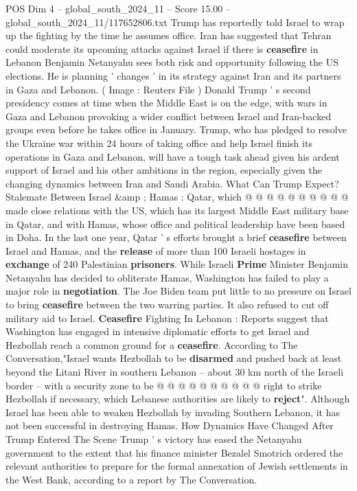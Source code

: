\begin{textsample}{POS Dim 4 – global\_south\_2024\_11 – Score 15.00 – global\_south\_2024\_11/117652806.txt}  \label{ex:f4_pos_259}
Trump has reportedly told Israel to wrap up the fighting by the time he assumes office.
Iran has suggested that Tehran could moderate its upcoming attacks against Israel if there is \textbf{ceasefire} in Lebanon Benjamin Netanyahu sees both risk and opportunity following the US elections.
He is planning ' changes ' in its strategy against Iran and its partners in Gaza and Lebanon. ( Image : Reuters File ) Donald Trump ' s second presidency comes at time when the Middle East is on the edge, with wars in Gaza and Lebanon provoking a wider conflict between Israel and Iran-backed groups even before he takes office in January.
Trump, who has pledged to resolve the Ukraine war within 24 hours of taking office and help Israel finish its operations in Gaza and Lebanon, will have a tough task ahead given his ardent support of Israel and his other ambitions in the region, especially given the changing dynamics between Iran and Saudi Arabia.
What Can Trump Expect?
Stalemate Between Israel \&amp ; Hamas : Qatar, which @ @ @ @ @ @ @ @ @ @ made close relations with the US, which has its largest Middle East military base in Qatar, and with Hamas, whose office and political leadership have been based in Doha.
In the last one year, Qatar ' s efforts brought a brief \textbf{ceasefire} between Israel and Hamas, and the \textbf{release} of more than 100 Israeli hostages in \textbf{exchange} of 240 Palestinian \textbf{prisoners}.
While Israeli \textbf{Prime} Minister Benjamin Netanyahu has decided to obliterate Hamas, Washington has failed to play a major role in \textbf{negotiation}.
The Joe Biden team put little to no pressure on Israel to bring \textbf{ceasefire} between the two warring parties.
It also refused to cut off military aid to Israel. \textbf{Ceasefire} Fighting In Lebanon : Reports suggest that Washington has engaged in intensive diplomatic efforts to get Israel and Hezbollah reach a common ground for a \textbf{ceasefire}.
According to The Conversation,"Israel wants Hezbollah to be \textbf{disarmed} and pushed back at least beyond the Litani River in southern Lebanon -- about 30 km north of the Israeli border -- with a security zone to be @ @ @ @ @ @ @ @ @ @ right to strike Hezbollah if necessary, which Lebanese authorities are likely to \textbf{reject}".
Although Israel has been able to weaken Hezbollah by invading Southern Lebanon, it has not been successful in destroying Hamas.
How Dynamics Have Changed After Trump Entered The Scene Trump ' s victory has eased the Netanyahu government to the extent that his finance minister Bezalel Smotrich ordered the relevant authorities to prepare for the formal annexation of Jewish settlements in the West Bank, according to a report by The Conversation.

\end{textsample}
